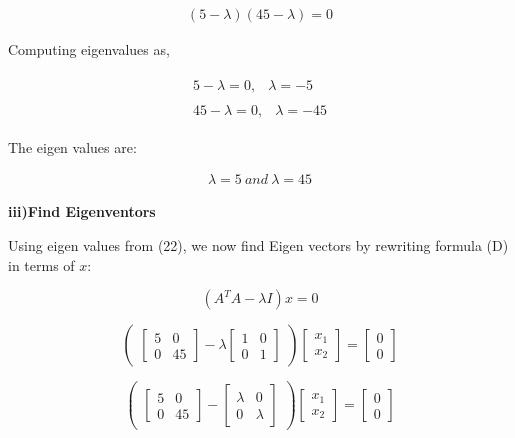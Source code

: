 \documentclass[a4paper]{report}
\begin{document}
\begin{align*}
    (5-\lambda)(45-\lambda)=0
\end{align*}

Computing eigenvalues as,

\begin{align*}
    \begin{split}
        5-\lambda=0,&\lambda=-5
    \end{split}\\
    \begin{split}
        45-\lambda=0,&\lambda=-45
    \end{split}
\end{align*}

The eigen values are: 

\begin{align}
    \lambda = 5\  and\  \lambda=45
\end{align}


\textbf{iii)Find Eigenventors}

Using eigen values from (22), we now find Eigen vectors by rewriting formula (D) in terms of $x$:


\begin{equation*}
    (A^TA-\lambda I)x=0 
\end{equation*}


\[\begin{pmatrix}
\begin{bmatrix}
    5&0\\0&45
\end{bmatrix}-\lambda \begin{bmatrix}
    1&0\\0&1
\end{bmatrix} \end{pmatrix} \begin{bmatrix}
    x_1\\x_2
\end{bmatrix} =\begin{bmatrix}
    0\\0
\end{bmatrix} \]

 \[ \begin{pmatrix}
\begin{bmatrix}
    5&0\\0&45
\end{bmatrix}- \begin{bmatrix}
    \lambda&0\\0&\lambda
\end{bmatrix} \end{pmatrix} \begin{bmatrix}
    x_1\\x_2
\end{bmatrix} =\begin{bmatrix}
    0\\0
\end{bmatrix} \]
\end{document}
